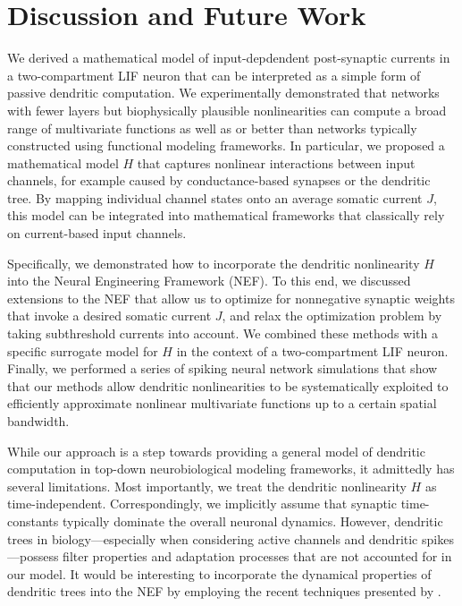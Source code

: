 
\section{Discussion and Future Work}
\label{sec:nlif_discussion}

We derived a mathematical model of input-depdendent post-synaptic currents in a two-compartment LIF neuron that can be interpreted as a simple form of passive dendritic computation. We experimentally demonstrated that networks with fewer layers but biophysically plausible nonlinearities can compute a broad range of multivariate functions as well as or better than networks typically constructed using functional modeling frameworks. In particular, we proposed a mathematical model $H$ that captures nonlinear interactions between input channels, for example caused by conductance-based synapses or the dendritic tree. By mapping individual channel states onto an average somatic current $J$, this model can be integrated into mathematical frameworks that classically rely on current-based input channels.

Specifically, we demonstrated how to incorporate the dendritic nonlinearity $H$ into the Neural Engineering Framework (NEF). To this end, we discussed extensions to the NEF that allow us to optimize for nonnegative synaptic weights that invoke a desired somatic current $J$, and relax the optimization problem by taking subthreshold currents into account. We combined these methods with a specific surrogate model for $H$ in the context of a two-compartment LIF neuron. Finally, we performed a series of spiking neural network simulations that show that our methods allow dendritic nonlinearities to be systematically exploited to efficiently approximate nonlinear multivariate functions up to a certain spatial bandwidth.

While our approach is a step towards providing a general model of dendritic computation in top-down neurobiological modeling frameworks, it admittedly has several limitations. Most importantly, we treat the dendritic nonlinearity $H$ as time-independent. Correspondingly, we implicitly assume that synaptic time-constants typically dominate the overall neuronal dynamics. However, dendritic trees in biology---especially when considering active channels and dendritic spikes \citep{koch1999biophysics}---possess filter properties and adaptation processes that are not accounted for in our model. It would be interesting to incorporate the dynamical properties of dendritic trees into the NEF by employing the recent techniques presented by \cite{voelker2018improvinga}.

